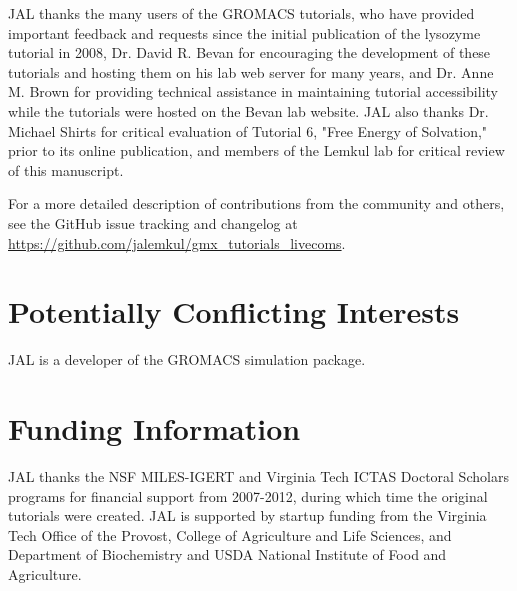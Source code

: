 \documentclass[9pt,tutorial]{livecoms}
\newcommand{\githubrepository}{\url{https://github.com/jalemkul/gmx_tutorials_livecoms}}  %
\begin{document}
JAL thanks the many users of the GROMACS tutorials, who have provided important feedback and requests since the initial publication of the lysozyme tutorial in 2008, Dr. David R. Bevan for encouraging the development of these tutorials and hosting them on his lab web server for many years, and Dr. Anne M. Brown for providing technical assistance in maintaining tutorial accessibility while the tutorials were hosted on the Bevan lab website. JAL also thanks Dr. Michael Shirts for critical evaluation of Tutorial 6, "Free Energy of Solvation," prior to its online publication, and members of the Lemkul lab for critical review of this manuscript.

For a more detailed description of contributions from the community and others, see the GitHub issue tracking and changelog at \githubrepository.

\section{Potentially Conflicting Interests}

JAL is a developer of the GROMACS simulation package.

\section{Funding Information}
JAL thanks the NSF MILES-IGERT and Virginia Tech ICTAS Doctoral Scholars programs for financial support from 2007-2012, during which time the original tutorials were created. JAL is supported by startup funding from the Virginia Tech Office of the Provost, College of Agriculture and Life Sciences, and Department of Biochemistry and USDA National Institute of Food and Agriculture.




\end{document}
